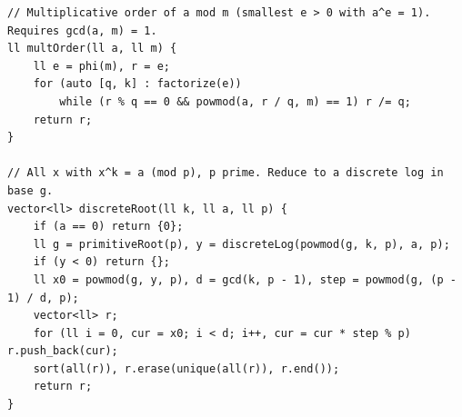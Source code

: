 \documentclass[9pt,a4paper,twocolumn]{extarticle}
\begin{document}
\begin{lstlisting}
// Multiplicative order of a mod m (smallest e > 0 with a^e = 1). Requires gcd(a, m) = 1.
ll multOrder(ll a, ll m) {
    ll e = phi(m), r = e;
    for (auto [q, k] : factorize(e))
        while (r % q == 0 && powmod(a, r / q, m) == 1) r /= q;
    return r;
}

// All x with x^k = a (mod p), p prime. Reduce to a discrete log in base g.
vector<ll> discreteRoot(ll k, ll a, ll p) {
    if (a == 0) return {0};
    ll g = primitiveRoot(p), y = discreteLog(powmod(g, k, p), a, p);
    if (y < 0) return {};
    ll x0 = powmod(g, y, p), d = gcd(k, p - 1), step = powmod(g, (p - 1) / d, p);
    vector<ll> r;
    for (ll i = 0, cur = x0; i < d; i++, cur = cur * step % p) r.push_back(cur);
    sort(all(r)), r.erase(unique(all(r)), r.end());
    return r;
}
\end{lstlisting}

\filbreak
\end{document}
